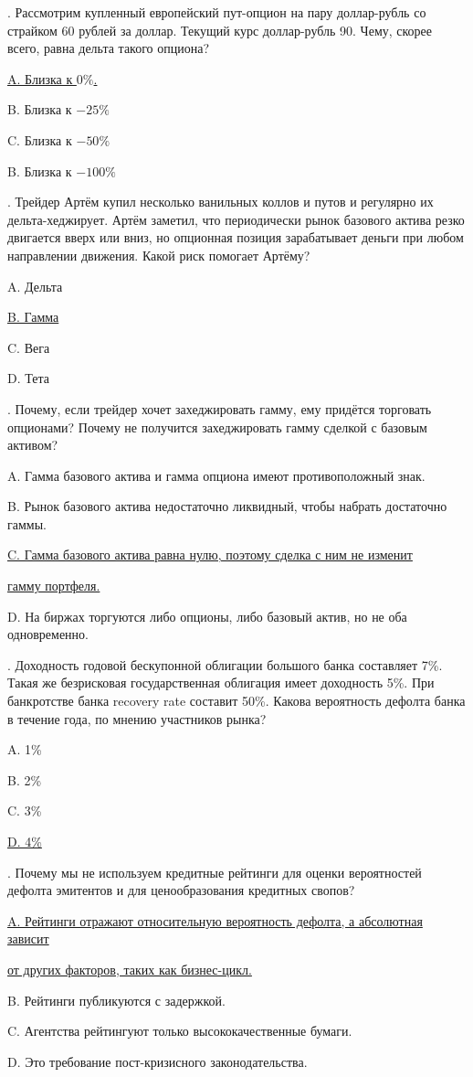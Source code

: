 \documentclass[a4paper,12pt]{extarticle}
\begin{document}
\thispagestyle{empty}

. Рассмотрим купленный европейский пут-опцион на пару доллар-рубль со страйком 60 рублей за доллар. Текущий курс доллар-рубль 90. Чему, скорее всего, равна дельта такого опциона?

\underline{A. Близка к $0\%$.}

B. Близка к $-25\%$

C. Близка к $-50\%$

B. Близка к $-100\%$

\vspace{0.5cm}

. Трейдер Артём купил несколько ванильных коллов и путов и регулярно их дельта-хеджирует. Артём заметил, что периодически рынок базового актива резко двигается вверх или вниз, но опционная позиция зарабатывает деньги при любом направлении движения. Какой риск помогает Артёму?

A. Дельта

\underline{B. Гамма}

C. Вега

D. Тета

\vspace{0.5cm}

. Почему, если трейдер хочет захеджировать гамму, ему придётся торговать опционами? Почему не получится захеджировать гамму сделкой с базовым активом?

A. Гамма базового актива и гамма опциона имеют противоположный знак.

B. Рынок базового актива недостаточно ликвидный, чтобы набрать достаточно гаммы.

\underline{C. Гамма базового актива равна нулю, поэтому сделка с ним не изменит}

\underline{гамму портфеля.}

D. На биржах торгуются либо опционы, либо базовый актив, но не оба одновременно.

\vspace{0.5cm}

. Доходность годовой бескупонной облигации большого банка составляет 7\%. Такая же безрисковая государственная облигация имеет доходность 5\%. При банкротстве банка recovery rate составит 50\%. Какова вероятность дефолта банка в течение года, по мнению участников рынка?

A. 1\%

B. 2\%

C. 3\%

\underline{D. 4\%}

\vspace{0.5cm}

. Почему мы не используем кредитные рейтинги для оценки вероятностей дефолта эмитентов и для ценообразования кредитных свопов?

\underline{A. Рейтинги отражают относительную вероятность дефолта, а абсолютная зависит}

\underline{от других факторов, таких как бизнес-цикл.}

B. Рейтинги публикуются с задержкой.

C. Агентства рейтингуют только высококачественные бумаги.

D. Это требование пост-кризисного законодательства.
\end{document}

